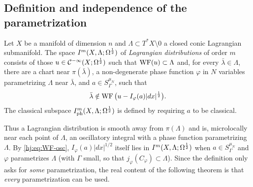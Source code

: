 \subsection{Definition and independence of the parametrization}

\begin{definition}\label{hj:def:lagrangian}
  Let $X$ be a manifold of dimension $n$ and $\Lambda\subset T^*X\setminus0$ a
  closed conic Lagrangian submanifold.  The space $I^{m}(X,\Lambda;\Omega^{\frac12})$
  of \emph{Lagrangian distributions} of order $m$ consists of those
  $u\in\mathcal{C}^{-\infty}(X;\Omega^{\frac12})$ such that $\operatorname{WF}(u)\subset\Lambda$ and, for every
  $\bar\lambda\in\Lambda$, there are a chart near $\pi(\bar\lambda)$, a
  non-degenerate phase function $\varphi$ in $N$ variables parametrizing
  $\Lambda$ near $\bar\lambda$, and $a\in S^{\mu_N}_\Gamma$, such that
  \begin{equation*}
    \bar\lambda\notin\operatorname{WF}\big(u-I_\varphi(a)|dx|^{\frac12}\big).
  \end{equation*}
  The classical subspace $I^{m}_{\mathrm{ph}}(X,\Lambda;\Omega^{\frac12})$ is defined
  by requiring $a$ to be classical.
\end{definition}

Thus a Lagrangian distribution is smooth away from $\pi(\Lambda)$ and is,
microlocally near each point of $\Lambda$, an oscillatory integral with a
phase function parametrizing $\Lambda$.  By \eqref{hj:eq:WF-osc},
$I_\varphi(a)|dx|^{1/2}$ itself lies in $I^{m}(X,\Lambda;\Omega^{\frac12})$ when
$a\in S^{\mu_N}_\Gamma$ and $\varphi$ parametrizes $\Lambda$ (with $\Gamma$ small,
so that $j_\varphi(C_\varphi)\subset\Lambda$).  Since the definition only asks
for \emph{some} parametrization, the real content of the following theorem is
that \emph{every} parametrization can be used.

